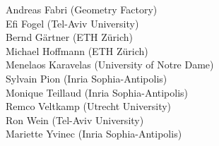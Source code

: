 
Andreas Fabri ({\sc Geometry Factory}) \\
Efi Fogel (Tel-Aviv University) \\
Bernd G\"artner (ETH Z\"urich) \\
Michael Hoffmann (ETH Z\"urich) \\
Menelaos Karavelas (University of Notre Dame)\\
Sylvain Pion ({\sc Inria} Sophia-Antipolis)\\
Monique Teillaud ({\sc Inria} Sophia-Antipolis)\\
Remco Veltkamp (Utrecht University)\\
Ron Wein (Tel-Aviv University) \\
Mariette Yvinec ({\sc Inria} Sophia-Antipolis)
